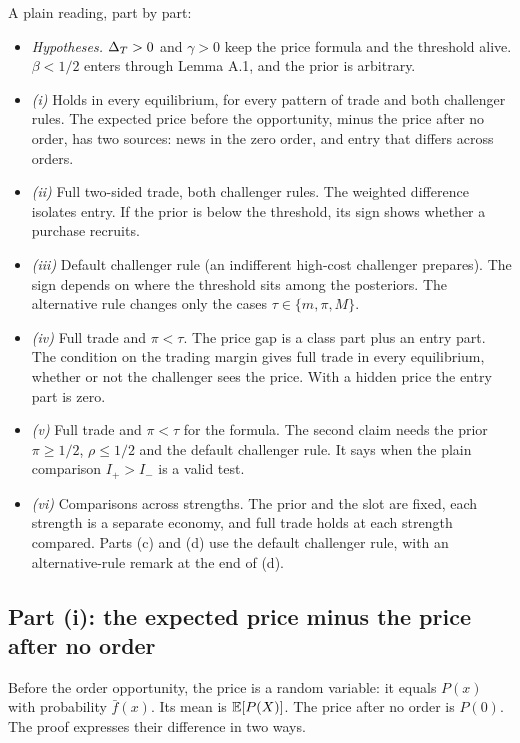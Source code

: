 A plain reading, part by part:
\begin{itemize}
\item \emph{Hypotheses.} \(\Delta_T>0\) and \(\gamma>0\) keep the price formula and the threshold alive. \(\beta<1/2\) enters through Lemma A.1, and the prior is arbitrary.
\item \emph{(i)} Holds in every equilibrium, for every pattern of trade and both challenger rules. The expected price before the opportunity, minus the price after no order, has two sources: news in the zero order, and entry that differs across orders.
\item \emph{(ii)} Full two-sided trade, both challenger rules. The weighted difference isolates entry. If the prior is below the threshold, its sign shows whether a purchase recruits.
\item \emph{(iii)} Default challenger rule (an indifferent high-cost challenger prepares). The sign depends on where the threshold sits among the posteriors. The alternative rule changes only the cases \(\tau\in\{m,\pi,M\}\).
\item \emph{(iv)} Full trade and \(\pi<\tau\). The price gap is a class part plus an entry part. The condition on the trading margin gives full trade in every equilibrium, whether or not the challenger sees the price. With a hidden price the entry part is zero.
\item \emph{(v)} Full trade and \(\pi<\tau\) for the formula. The second claim needs the prior \(\pi\ge1/2\), \(\rho\le1/2\) and the default challenger rule. It says when the plain comparison \(I_+>I_-\) is a valid test.
\item \emph{(vi)} Comparisons across strengths. The prior and the slot are fixed, each strength is a separate economy, and full trade holds at each strength compared. Parts (c) and (d) use the default challenger rule, with an alternative-rule remark at the end of (d).
\end{itemize}

\subsection{Part (i): the expected price minus the price after no order}\label{sec:empirical-spread-i}

Before the order opportunity, the price is a random variable: it equals \(P(x)\) with probability \(\bar f(x)\). Its mean is \(\mathbb{E}[P(X)]\). The price after no order is \(P(0)\). The proof expresses their difference in two ways.

